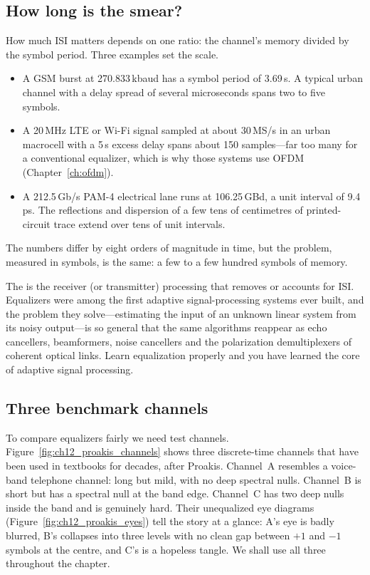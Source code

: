 \subsection{How long is the smear?}

How much ISI matters depends on one ratio: the channel's memory divided by the symbol period.
Three examples set the scale.
\begin{itemize}
\item A GSM burst at 270.833\,kbaud has a symbol period of 3.69\,\textmu s. A typical urban
channel with a delay spread of several microseconds spans two to five symbols.
\item A 20\,MHz LTE or Wi-Fi signal sampled at about 30\,MS/s in an urban macrocell with a
5\,\textmu s excess delay spans about 150 samples---far too many for a conventional equalizer, which
is why those systems use OFDM (Chapter~\ref{ch:ofdm}).
\item A 212.5\,Gb/s PAM-4 electrical lane runs at 106.25\,GBd, a unit interval of 9.4\,ps. The
reflections and dispersion of a few tens of centimetres of printed-circuit trace extend over tens
of unit intervals.
\end{itemize}

The numbers differ by eight orders of magnitude in time, but the problem, measured in
symbols, is the same: a few to a few hundred symbols of memory.

The  is the receiver (or transmitter) processing that removes or accounts for ISI.
Equalizers were among the first adaptive signal-processing systems ever built, and the problem
they solve---estimating the input of an unknown linear system from its noisy output---is so
general that the same algorithms reappear as echo cancellers, beamformers, noise cancellers and the
polarization demultiplexers of coherent optical links. Learn equalization properly and you have
learned the core of adaptive signal processing.

\subsection{Three benchmark channels}

To compare equalizers fairly we need test channels. Figure~\ref{fig:ch12_proakis_channels} shows
three discrete-time channels that have been used in textbooks for decades, after Proakis.
Channel~A resembles a voice-band telephone channel: long but mild, with no deep spectral nulls.
Channel~B is short but has a spectral null at the band edge. Channel~C has two deep nulls inside
the band and is genuinely hard. Their unequalized eye diagrams
(Figure~\ref{fig:ch12_proakis_eyes}) tell the story at a glance: A's eye is badly blurred, B's
collapses into three levels with no clean gap between $+1$ and $-1$ symbols at the centre, and C's
is a hopeless tangle. We shall use all three throughout the chapter.

